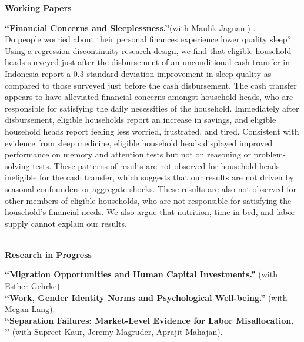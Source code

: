 \documentclass[10pt, oneside]{article}
\begin{document}
\begin{minipage}[t]{0.1\linewidth}
\textbf{Working Papers}
\end{minipage}\hspace{0.05\linewidth}
\begin{minipage}[t]{0.8\linewidth}
\textbf{``Financial Concerns and Sleeplessness.''}(with Maulik Jagnani) \href{https://github.com/claireduq/claireduq.github.io/blob/master/sleep_financial_concerns.pdf}{\color{blue}{Available here}}. \\
Do people worried about their personal finances experience lower quality sleep? Using a regression discontinuity research design, we find that eligible household heads surveyed just after the disbursement of an unconditional cash transfer in Indonesia report a 0.3 standard deviation improvement in sleep quality as compared to those surveyed just before the cash disbursement. The cash transfer appears to have alleviated financial concerns amongst household heads, who are responsible for satisfying the daily necessities of the household. Immediately after disbursement, eligible households report an increase in savings, and eligible household heads report feeling less worried, frustrated, and tired. Consistent with evidence from sleep medicine, eligible household heads displayed improved performance on memory and attention tests but not on reasoning or problem-solving tests. These patterns of results are not observed for household heads ineligible for the cash transfer, which suggests that our results are not driven by seasonal confounders or aggregate shocks. These results are also not observed for other members of eligible households, who are not responsible for satisfying the household's financial needs. We also argue that nutrition, time in bed, and labor supply cannot explain our results.\\~\\
\end{minipage}\vspace{4mm}

\begin{minipage}[t]{0.1\linewidth}
\textbf{Research in Progress}
\end{minipage}\hspace{0.05\linewidth}
\begin{minipage}[t]{0.8\linewidth}
\textbf{``Migration Opportunities and Human Capital Investments.''} (with Esther Gehrke). \\ 
\textbf{``Work, Gender Identity Norms and Psychological Well-being.''} (with Megan Lang). \\
\textbf{``Separation Failures: Market-Level Evidence for Labor Misallocation. ''} (with Supreet Kaur, Jeremy Magruder, Aprajit Mahajan). \\
\end{minipage}\vspace{4mm} 
\end{document}
